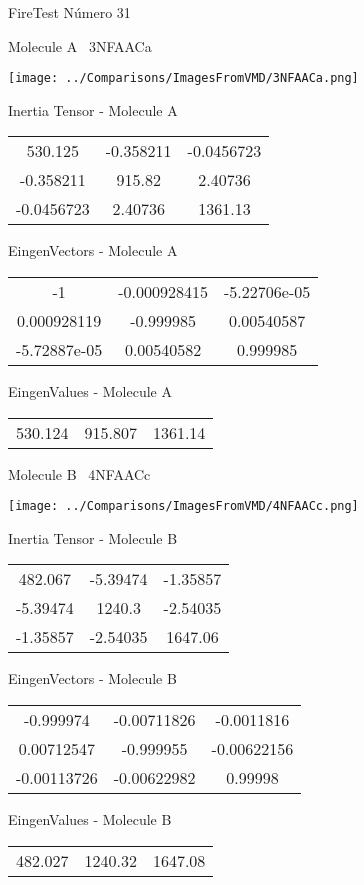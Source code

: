 \vtab[-3cm]
\begin{center}
{\large FireTest \tab Número 31}
\end{center}
\begin{multicols}{2}
\begin{center}

Molecule A \
3NFAACa

\texttt{[image: ../Comparisons/ImagesFromVMD/3NFAACa.png]}

Inertia Tensor - Molecule A \\
\begin{tabular}{|c c c|}
530.125	 & 	-0.358211	 & 	-0.0456723	 \\
-0.358211	 & 	915.82	 & 	2.40736	 \\
-0.0456723	 & 	2.40736	 & 	1361.13
\end{tabular}

\vtab
 EingenVectors - Molecule A     \\
\begin{tabular}{|c c c|}
-1	 & 	-0.000928415	 & 	-5.22706e-05	 \\
0.000928119	 & 	-0.999985	 & 	0.00540587	 \\
-5.72887e-05	 & 	0.00540582	 & 	0.999985
\end{tabular}

\vtab
 EingenValues - Molecule A     \\
\begin{tabular}{|c c c|}
530.124	 & 	915.807	 & 	1361.14	 \\
\end{tabular}
\columnbreak

Molecule B \
4NFAACc

\texttt{[image: ../Comparisons/ImagesFromVMD/4NFAACc.png]}

Inertia Tensor - Molecule B \\
\begin{tabular}{|c c c|}
482.067	 & 	-5.39474	 & 	-1.35857	 \\
-5.39474	 & 	1240.3	 & 	-2.54035	 \\
-1.35857	 & 	-2.54035	 & 	1647.06
\end{tabular}

\vtab
 EingenVectors - Molecule B     \\
\begin{tabular}{|c c c|}
-0.999974	 & 	-0.00711826	 & 	-0.0011816	 \\
0.00712547	 & 	-0.999955	 & 	-0.00622156	 \\
-0.00113726	 & 	-0.00622982	 & 	0.99998
\end{tabular}

\vtab
 EingenValues - Molecule B     \\
\begin{tabular}{|c c c|}
482.027	 & 	1240.32	 & 	1647.08	 \\
\end{tabular}

\end{center}
\end{multicols}

